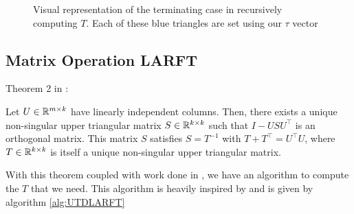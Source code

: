 \documentclass[12pt]{article}
\begin{document}
    \begin{figure}
        \begin{center}
        \end{center}
        \caption{Visual representation of the terminating case in recursively computing $T$. Each of these blue
        triangles are set using our $\tau$ vector}\label{fig:termCase}
    \end{figure}
    \subsection{Matrix Operation LARFT}
    \begin{theorem}\label{thm:Puglisi}
        Theorem 2 in \cite{Joff}:

        Let $U\in\mathbb{R}^{m\times k}$ have linearly independent columns. Then, there exists
        a unique non-singular upper triangular matrix $S\in\mathbb{R}^{k\times k}$ such that
        $I-USU^\top$ is an orthogonal matrix. This matrix $S$ satisfies $S=T^{-1}$ with
        $T+T^\top = U^\top U$, where $T\in\mathbb{R}^{k\times k}$ is itself a unique non-singular upper 
        triangular matrix.
    \end{theorem}
    With this theorem coupled with work done in \cite{Puglisi}, we have an algorithm to compute the $T$ that 
    we need. This algorithm is heavily inspired by \cite{Joff} and is given by algorithm \ref{alg:UTDLARFT}
\end{document}
